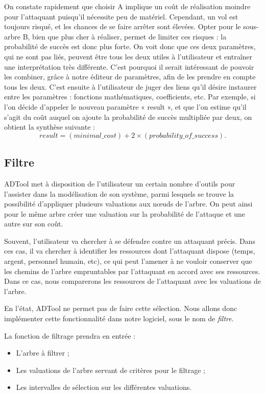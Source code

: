 			On constate rapidement que choisir A implique un coût de réalisation moindre pour l'attaquant puisqu'il nécessite peu de matériel. Cependant, un vol est toujours risqué, et les chances de se faire arrêter sont élevées. Opter pour le sous-arbre B, bien que plus cher à réaliser, permet de limiter ces risques : la probabilité de succès est donc plus forte. On voit donc que ces deux paramètres, qui ne sont pas liés, peuvent être tous les deux utiles à l'utilisateur et entraîner une interprétation très différente. C'est pourquoi il serait intéressant de pouvoir les combiner, grâce à notre éditeur de paramètres, afin de les prendre en compte tous les deux. C'est ensuite à l'utilisateur de juger des liens qu'il désire instaurer entre les paramètres : fonctions mathématiques, coefficients, etc. Par exemple, si l'on décide d'appeler le nouveau paramètre « result », et que l'on estime qu'il s'agit du coût auquel on ajoute la probabilité de succès multipliée par deux, on obtient la synthèse suivante : \[ result = (minimal\_cost) + 2 \times (probability\_of\_success).\]


	\subsection{Filtre}
		ADTool met à disposition de l'utilisateur un certain nombre d'outils pour l'assister dans la modélisation de son système, parmi lesquels se trouve la possibilité d'appliquer plusieurs valuations aux nœuds de l'arbre. On peut ainsi pour le même arbre créer une valuation sur la probabilité de l'attaque et une autre sur son coût.

		Souvent, l'utilisateur va chercher à se défendre contre un attaquant précis. Dans ces cas, il va chercher à identifier les ressources dont l'attaquant dispose (temps, argent, personnel humain, etc), ce qui peut l'amener à ne vouloir conserver que les chemins de l'arbre empruntables par l'attaquant en accord avec ses ressources. Dans ce cas, nous comparerons les ressources de l'attaquant avec les valuations de l'arbre.

		En l'état, ADTool ne permet pas de faire cette sélection. Nous allons donc implémenter cette fonctionnalité dans notre logiciel, sous le nom de \textit{filtre}. %

		La fonction de filtrage prendra en entrée : 
		\begin{itemize}
			\item L'arbre à filtrer ;
			\item Les valuations de l'arbre servant de critères pour le filtrage ;
			\item Les intervalles de sélection sur les différentes valuations.
		\end{itemize} %

